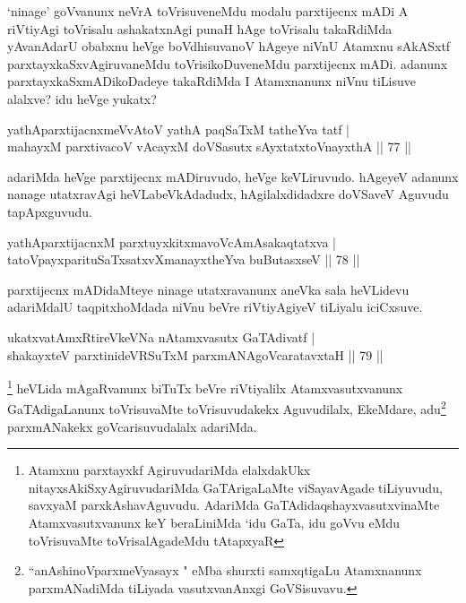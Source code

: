 \begin{artha}
\stext `ninage'  goVvanunx neVrA toVrisuveneMdu modalu parxtijecnx mADi A riVtiyAgi toVrisalu ashakatxnAgi punaH hAge toVrisalu takaRdiMda yAvanAdarU obabxnu heVge boVdhisuvanoV hAgeye niVnU Atamxnu sAkASxtf parxtayxkaSxvAgiruvaneMdu toVrisikoDuveneMdu parxtijecnx mADi. adanunx parxtayxkaSxmADikoDadeye takaRdiMda I Atamxnanunx niVnu tiLisuve alalxve? idu heVge yukatx?
\end{artha}

\begin{shl}
yathAparxtijacnxmeVvAtoV yathA paqSaTxM tatheYva tatf |\\
mahayxM parxtivacoV vAcayxM doVSasutx sAyxtatxtoV\s nayxthA \hfill || 77 ||
\end{shl}

\begin{artha}%
adariMda heVge parxtijecnx mADiruvudo, heVge keVLiruvudo. hAgeyeV adanunx nanage utatxravAgi heVLabeVkAdadudx, hAgilalxdidadxre doVSaveV Aguvudu tapApxguvudu.
\end{artha}


\begin{shl}
yathAparxtijacnxM parxtuyxkitxmavoVcAmAsakaqtatxva |\\
tatoV\s payxparituSaTxsatxvXmanayxtheYva buButasxseV \hfill || 78 ||
\end{shl}

\begin{artha}
parxtijecnx mADidaMteye ninage utatxravanunx aneVka sala heVLidevu adariMdalU taqpitxhoMdada niVnu beVre riVtiyAgiyeV tiLiyalu iciCxsuve. 
\end{artha}


\begin{shl}
ukatxvatAmxRtireVkeVNa nA\s \s tamxvasutx GaTAdivatf |\\
shakayxteV parxtinideVRSuTxM parxmANAgoVcaratavxtaH \hfill || 79 ||
\end{shl}

\begin{artha}
\footnote{Atamxnu parxtayxkf AgiruvudariMda elalxdakUkx nitayxsAkiSxyAgiruvudariMda GaTArigaLaMte viSayavAgade tiLiyuvudu, savxyaM parxkAshavAguvudu. AdariMda GaTAdidaqshayxvasutxvinaMte Atamxvasutxvanunx keY beraLiniMda `idu GaTa, idu goVvu eMdu toVrisuvaMte toVrisalAgadeMdu tAtapxyaR} heVLida mAgaRvanunx biTuTx beVre riVtiyalilx Atamxvasutxvanunx GaTAdigaLanunx toVrisuvaMte toVrisuvudakekx Aguvudilalx, EkeMdare, adu\footnote{``anAshinoV\s parxmeVyasayx " eMba shurxti samxqtigaLu Atamxnanunx parxmANadiMda tiLiyada vasutxvanAnxgi GoVSisuvavu.} parxmANakekx goVcarisuvudalalx adariMda.
\end{artha}


